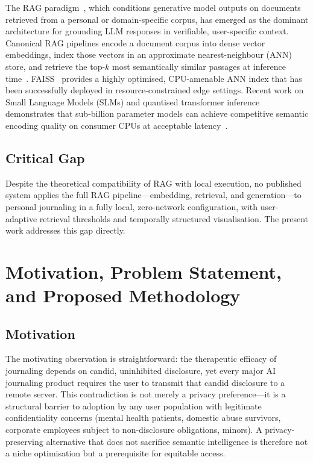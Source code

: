\documentclass[12pt, letterpaper]{article}
\begin{document}
The RAG paradigm~\cite{lewis2020rag}, which conditions
generative model outputs on documents retrieved from a
personal or domain-specific corpus, has emerged as the
dominant architecture for grounding LLM responses in
verifiable, user-specific context.
Canonical RAG pipelines encode a document corpus into dense
vector embeddings, index those vectors in an approximate
nearest-neighbour (ANN) store, and retrieve the top-$k$
most semantically similar passages at inference
time~\cite{karpukhin2020dpr}.
FAISS~\cite{johnson2021faiss} provides a highly optimised,
CPU-amenable ANN index that has been successfully deployed in
resource-constrained edge settings.
Recent work on Small Language Models (SLMs) and quantised
transformer inference demonstrates that sub-billion parameter
models can achieve competitive semantic encoding quality on
consumer CPUs at acceptable
latency~\cite{dettmers2022llmint8}.

\subsection{Critical Gap}

Despite the theoretical compatibility of RAG with local
execution, no published system applies the full RAG
pipeline---embedding, retrieval, and generation---to personal
journaling in a fully local, zero-network configuration, with
user-adaptive retrieval thresholds and temporally structured
visualisation.
The present work addresses this gap directly.

\section{Motivation, Problem Statement, and Proposed Methodology}

\subsection{Motivation}

The motivating observation is straightforward: the therapeutic
efficacy of journaling depends on candid, uninhibited
disclosure, yet every major AI journaling product requires the
user to transmit that candid disclosure to a remote server.
This contradiction is not merely a privacy preference---it is a
structural barrier to adoption by any user population with
legitimate confidentiality concerns (mental health patients,
domestic abuse survivors, corporate employees subject to
non-disclosure obligations, minors).
A privacy-preserving alternative that does not sacrifice
semantic intelligence is therefore not a niche optimisation
but a prerequisite for equitable access.
\end{document}
